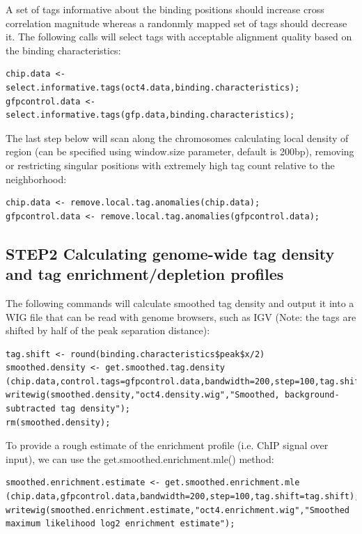 \begin{steps}
A set of tags informative about the binding positions should increase cross correlation magnitude whereas a randonmly mapped set of tags should decrease it.
The following calls will select tags with acceptable alignment quality based on the binding characteristics:

\begin{lstlisting}
chip.data <- select.informative.tags(oct4.data,binding.characteristics);
gfpcontrol.data <- select.informative.tags(gfp.data,binding.characteristics);
\end{lstlisting}
\end{steps}

\begin{steps}
The last step below will scan along the chromosomes calculating local density of region (can be specified using window.size parameter, default is 200bp), removing or restricting singular positions with extremely high tag count relative to the neighborhood:

\begin{lstlisting}
chip.data <- remove.local.tag.anomalies(chip.data);
gfpcontrol.data <- remove.local.tag.anomalies(gfpcontrol.data);
\end{lstlisting}
\end{steps}



\subsection {STEP2 Calculating genome-wide tag density and tag enrichment/depletion profiles}
\begin{steps}
The following commands will calculate smoothed tag density and output it into a WIG file that can be read with genome browsers, 
such as IGV (Note: the tags are shifted by half of the peak separation distance): 

\begin{lstlisting}
tag.shift <- round(binding.characteristics$peak$x/2)
smoothed.density <- get.smoothed.tag.density
(chip.data,control.tags=gfpcontrol.data,bandwidth=200,step=100,tag.shift=tag.shift);
writewig(smoothed.density,"oct4.density.wig","Smoothed, background-subtracted tag density");
rm(smoothed.density);
\end{lstlisting}
\end{steps}


\begin{steps}
To provide a rough estimate of the enrichment profile (i.e. ChIP signal over input), we can use the get.smoothed.enrichment.mle() method:
\begin{lstlisting}
smoothed.enrichment.estimate <- get.smoothed.enrichment.mle
(chip.data,gfpcontrol.data,bandwidth=200,step=100,tag.shift=tag.shift);
writewig(smoothed.enrichment.estimate,"oct4.enrichment.wig","Smoothed maximum likelihood log2 enrichment estimate");
\end{lstlisting}
\end{steps}


